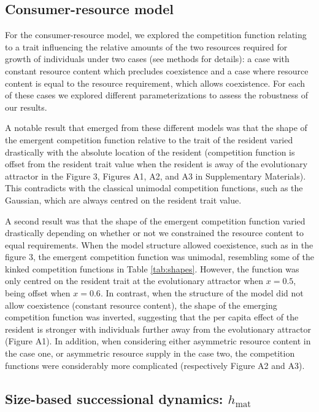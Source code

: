 \documentclass[a4paper,11pt]{article}
\newcommand{\hmat}{\ensuremath{h_{\text{mat}}}}
\begin{document}
\subsection{Consumer-resource model}

For the consumer-resource model, we explored the competition function relating to a trait influencing the relative amounts of the two resources required for growth of individuals under two cases (see methods for details): a case with constant resource content which precludes coexistence and a case where resource content is equal to the resource requirement, which allows coexistence. For each of these cases we explored different parameterizations to assess the robustness of our results.

A notable result that emerged from these different models was that the shape of the emergent competition function relative to the trait of the resident varied drastically with the absolute location of the resident (competition function is offset from the resident trait value when the resident is away of the evolutionary attractor in the Figure 3, Figures A1, A2, and A3 in Supplementary Materials). This contradicts with the classical unimodal competition functions, such as the Gaussian, which are always centred on the resident trait value. 

A second result was that the shape of the emergent competition function varied drastically depending on whether or not we constrained the resource content to equal requirements. When the model structure allowed coexistence, such as in the figure 3, the emergent competition function was unimodal, resembling some of the kinked competition functions in Table \ref{tab:shapes}. However, the function was only centred on the resident trait at the evolutionary attractor when $x = 0.5$, being offset when $x = 0.6$. In contrast, when the structure of the model did not allow coexistence (constant resource content), the shape of the emerging competition function was inverted, suggesting that the per capita effect of the resident is stronger with individuals further away from the evolutionary attractor (Figure A1). In addition, when considering either asymmetric resource content in the case one, or asymmetric resource supply in the case two, the competition functions were considerably more complicated (respectively Figure A2 and A3). 

\subsection{Size-based successional dynamics: \hmat}
\end{document}
